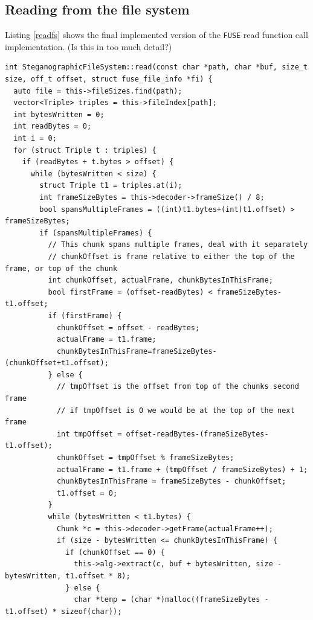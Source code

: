 \documentclass[paper=a4, fontsize=11pt,twoside]{scrartcl}
\numberwithin{table}{section}
\numberwithin{figure}{section}
\numberwithin{algorithm}{section}
\begin{document}
\subsection{Reading from the file system}
\label{app:coderead}

Listing \ref{readfs} shows the final implemented version of the \texttt{FUSE} read function call implementation. (Is this in too much detail?)

\begin{lstlisting}[caption={\texttt{FUSE} read function call implementation.}, frame=single, label=readfs,showstringspaces=false,upquote=true]
int SteganographicFileSystem::read(const char *path, char *buf, size_t size, off_t offset, struct fuse_file_info *fi) {
  auto file = this->fileSizes.find(path);
  vector<Triple> triples = this->fileIndex[path];
  int bytesWritten = 0;
  int readBytes = 0;
  int i = 0;
  for (struct Triple t : triples) {
    if (readBytes + t.bytes > offset) {
      while (bytesWritten < size) {
        struct Triple t1 = triples.at(i);
        int frameSizeBytes = this->decoder->frameSize() / 8;
        bool spansMultipleFrames = ((int)t1.bytes+(int)t1.offset) > frameSizeBytes;
        if (spansMultipleFrames) {
          // This chunk spans multiple frames, deal with it separately
          // chunkOffset is frame relative to either the top of the frame, or top of the chunk
          int chunkOffset, actualFrame, chunkBytesInThisFrame;
          bool firstFrame = (offset-readBytes) < frameSizeBytes-t1.offset;
          if (firstFrame) {
            chunkOffset = offset - readBytes;
            actualFrame = t1.frame;
            chunkBytesInThisFrame=frameSizeBytes-(chunkOffset+t1.offset);
          } else {
            // tmpOffset is the offset from top of the chunks second frame
            // if tmpOffset is 0 we would be at the top of the next frame
            int tmpOffset = offset-readBytes-(frameSizeBytes-t1.offset);
            chunkOffset = tmpOffset % frameSizeBytes;
            actualFrame = t1.frame + (tmpOffset / frameSizeBytes) + 1;
            chunkBytesInThisFrame = frameSizeBytes - chunkOffset;
            t1.offset = 0;
          }
          while (bytesWritten < t1.bytes) {
            Chunk *c = this->decoder->getFrame(actualFrame++);
            if (size - bytesWritten <= chunkBytesInThisFrame) {
              if (chunkOffset == 0) {
                this->alg->extract(c, buf + bytesWritten, size - bytesWritten, t1.offset * 8);
              } else {
                char *temp = (char *)malloc((frameSizeBytes - t1.offset) * sizeof(char));

\end{lstlisting}
\end{document}
